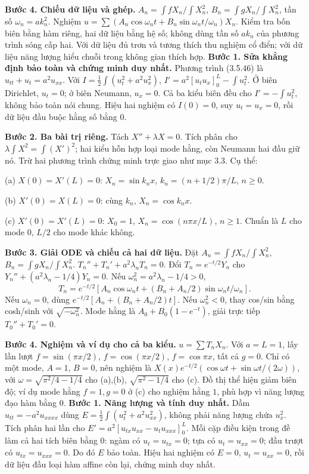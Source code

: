 \textbf{Bước 4. Chiếu dữ liệu và ghép.} $A_n=\int fX_n/\int X_n^2$, $B_n=\int gX_n/\int X_n^2$, tần số $\omega_n=ak_n^2$. Nghiệm $u=\sum(A_n\cos\omega_nt+B_n\sin\omega_nt/\omega_n)X_n$. Kiểm tra bốn biên bằng hàm riêng, hai dữ liệu bằng hệ số; không dùng tần số $ak_n$ của phương trình sóng cấp hai. Với dữ liệu đủ trơn và tương thích thu nghiệm cổ điển; với dữ liệu năng lượng hiểu chuỗi trong không gian thích hợp.
\textbf{Bước 1. Sửa khẳng định bảo toàn và chứng minh duy nhất.} Phương trình (3.5.46) là $u_{tt}+u_t=a^2u_{xx}$. Với $I=\frac12\int(u_t^2+a^2u_x^2)$, $I'=a^2[u_tu_x]_0^L-\int u_t^2$. Ở biên Dirichlet, $u_t=0$; ở biên Neumann, $u_x=0$. Cả ba kiểu biên đều cho $I'=-\int u_t^2$, không bảo toàn nói chung. Hiệu hai nghiệm có $I(0)=0$, suy $u_t=u_x=0$, rồi dữ liệu đầu buộc hằng số bằng $0$.

\textbf{Bước 2. Ba bài trị riêng.} Tách $X''+\lambda X=0$. Tích phân cho $\lambda\int X^2=\int(X')^2$; hai kiểu hỗn hợp loại mode hằng, còn Neumann hai đầu giữ nó. Trừ hai phương trình chứng minh trực giao như mục 3.3. Cụ thể:

(a) $X(0)=X'(L)=0$: $X_n=\sin k_nx$, $k_n=(n+1/2)\pi/L$, $n\ge0$.

(b) $X'(0)=X(L)=0$: cùng $k_n$, $X_n=\cos k_nx$.

(c) $X'(0)=X'(L)=0$: $X_0=1$, $X_n=\cos(n\pi x/L)$, $n\ge1$. Chuẩn là $L$ cho mode $0$, $L/2$ cho mode khác không.

\textbf{Bước 3. Giải ODE và chiếu cả hai dữ liệu.} Đặt $A_n=\int fX_n/\int X_n^2$, $B_n=\int gX_n/\int X_n^2$. $T_n''+T_n'+a^2\lambda_nT_n=0$. Đổi $T_n=e^{-t/2}Y_n$ cho $Y_n''+(a^2\lambda_n-1/4)Y_n=0$. Nếu $\omega_n^2=a^2\lambda_n-1/4>0$,
\[T_n=e^{-t/2}[A_n\cos\omega_nt+(B_n+A_n/2)\sin\omega_nt/\omega_n].\]
Nếu $\omega_n=0$, dùng $e^{-t/2}[A_n+(B_n+A_n/2)t]$. Nếu $\omega_n^2<0$, thay cos/sin bằng cosh/sinh với $\sqrt{-\omega_n^2}$. Mode hằng là $A_0+B_0(1-e^{-t})$, giải trực tiếp $T_0''+T_0'=0$.

\textbf{Bước 4. Nghiệm và ví dụ cho cả ba kiểu.} $u=\sum T_nX_n$. Với $a=L=1$, lấy lần lượt $f=\sin(\pi x/2)$, $f=\cos(\pi x/2)$, $f=\cos\pi x$, tất cả $g=0$. Chỉ có một mode, $A=1$, $B=0$, nên nghiệm là $X(x)e^{-t/2}(\cos\omega t+\sin\omega t/(2\omega))$, với $\omega=\sqrt{\pi^2/4-1/4}$ cho (a),(b), $\sqrt{\pi^2-1/4}$ cho (c). Đồ thị thể hiện giảm biên độ; ví dụ mode hằng $f=1,g=0$ ở (c) cho nghiệm hằng $1$, phù hợp vì năng lượng đạo hàm bằng $0$.
\textbf{Bước 1. Năng lượng và tính duy nhất.} Dầm $u_{tt}=-a^2u_{xxxx}$ dùng $E=\frac12\int(u_t^2+a^2u_{xx}^2)$, không phải năng lượng chứa $u_x^2$. Tích phân hai lần cho $E'=a^2[u_{tx}u_{xx}-u_tu_{xxx}]_0^L$. Mỗi cặp điều kiện trong đề làm cả hai tích biên bằng $0$: ngàm có $u_t=u_{tx}=0$; tựa có $u_t=u_{xx}=0$; đầu trượt có $u_{tx}=u_{xxx}=0$. Do đó $E$ bảo toàn. Hiệu hai nghiệm có $E=0$, $u_t=u_{xx}=0$, rồi dữ liệu đầu loại hàm affine còn lại, chứng minh duy nhất.

